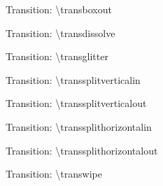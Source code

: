 \documentclass[english,sectioncirclenumberstyle]{ciadbeamer}
\begin{document}
\begin{frame}[c]{Transition: {\textbackslash}transboxout}
	\transboxout
	\begin{center}
	\end{center}
\end{frame}

\begin{frame}[c]{Transition: {\textbackslash}transdissolve}
	\transdissolve
	\begin{center}
	\end{center}
\end{frame}

\begin{frame}[c]{Transition: {\textbackslash}transglitter}
	\transglitter
	\begin{center}
	\end{center}
\end{frame}

\begin{frame}[c]{Transition: {\textbackslash}transsplitverticalin}
	\transsplitverticalin
	\begin{center}
	\end{center}
\end{frame}

\begin{frame}[c]{Transition: {\textbackslash}transsplitverticalout}
	\transsplitverticalout
	\begin{center}
	\end{center}
\end{frame}

\begin{frame}[c]{Transition: {\textbackslash}transsplithorizontalin}
	\transsplithorizontalin
	\begin{center}
	\end{center}
\end{frame}

\begin{frame}[c]{Transition: {\textbackslash}transsplithorizontalout}
	\transsplithorizontalout
	\begin{center}
	\end{center}
\end{frame}

\begin{frame}[c]{Transition: {\textbackslash}transwipe}
	\transwipe
	\begin{center}
	\end{center}
\end{frame}
\end{document}
